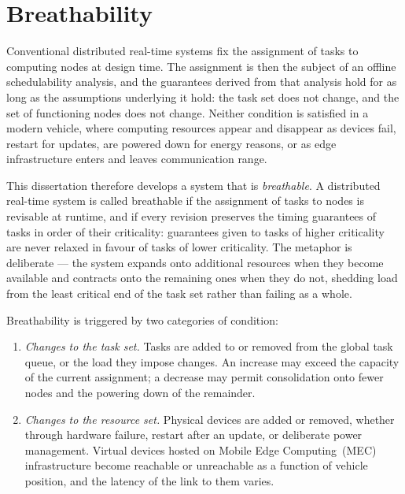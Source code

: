 \section{Breathability}\label{sec:breathability}

Conventional distributed real-time systems fix the assignment of tasks to
computing nodes at design time. The assignment is then the subject of an
offline schedulability analysis, and the guarantees derived from that analysis
hold for as long as the assumptions underlying it hold: the task set does not
change, and the set of functioning nodes does not change. Neither condition is
satisfied in a modern vehicle, where computing resources appear and disappear
as devices fail, restart for updates, are powered down for energy reasons, or
as edge infrastructure enters and leaves communication range.

This dissertation therefore develops a system that is \emph{breathable}. A
distributed real-time system is called breathable if the assignment of tasks to
nodes is revisable at runtime, and if every revision preserves the timing
guarantees of tasks in order of their criticality: guarantees given to tasks of
higher criticality are never relaxed in favour of tasks of lower criticality.
The metaphor is deliberate --- the system expands onto additional resources
when they become available and contracts onto the remaining ones when they do
not, shedding load from the least critical end of the task set rather than
failing as a whole.

Breathability is triggered by two categories of condition:

\begin{enumerate}
  \item \emph{Changes to the task set.} Tasks are added to or removed from the
    global task queue, or the load they impose changes. An increase may exceed
    the capacity of the current assignment; a decrease may permit consolidation
    onto fewer nodes and the powering down of the remainder.

  \item \emph{Changes to the resource set.} Physical devices are added or
    removed, whether through hardware failure, restart after an update, or
    deliberate power management. Virtual devices hosted on Mobile Edge
    Computing~(MEC) infrastructure become reachable or unreachable as a function
    of vehicle position, and the latency of the link to them varies.
\end{enumerate}

